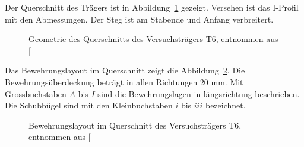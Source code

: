 \documentclass[
  11pt,
  letterpaper,
]{scrreprt}
\begin{document}
Der Querschnitt des Trägers ist in Abbildung~\ref{fig-geometrie_qs_t6}
gezeigt. Versehen ist das I-Profil mit den Abmessungen. Der Steg ist am
Stabende und Anfang verbreitert.

\begin{figure}[H]


\caption{\label{fig-geometrie_qs_t6}Geometrie des Querschnitts des
Versuchsträgers T6, entnommen aus
{[}\citeproc{ref-sigrist_versuche_1993}{5}{]}}

\end{figure}%

Das Bewehrungslayout im Querschnitt zeigt die
Abbildung~\ref{fig-bewehrung_qs_t6}. Die Bewehrungsüberdeckung beträgt
in allen Richtungen \(20\) mm. Mit Grossbuchstaben \(A\) bis \(I\) sind
die Bewehrungslagen in längsrichtung beschrieben. Die Schubbügel sind
mit den Kleinbuchstaben \(i\) bis \(iii\) bezeichnet.

\begin{figure}[H]


\caption{\label{fig-bewehrung_qs_t6}Bewehrungslayout im Querschnitt des
Versuchsträgers T6, entnommen aus
{[}\citeproc{ref-sigrist_versuche_1993}{5}{]}}

\end{figure}%
\end{document}

